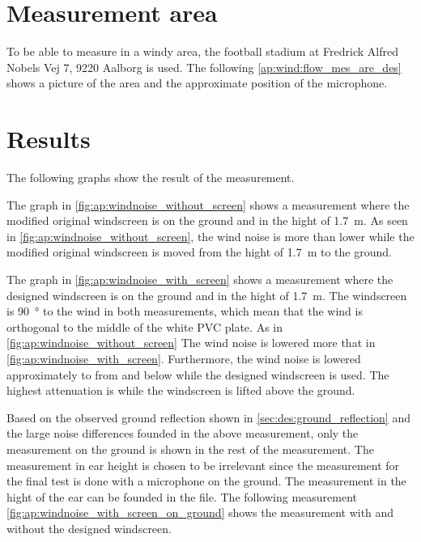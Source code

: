 \section*{Measurement area}
To be able to measure in a windy area, the football stadium at Fredrick Alfred Nobels Vej 7, 9220 Aalborg is used. The following \autoref{ap:wind:flow_mes_are_des} shows a picture of the area and the approximate position of the microphone.


\section*{Results}

The following graphs show the result of the measurement. 



The graph in \autoref{fig:ap:windnoise_without_screen} shows a measurement where the modified original windscreen is on the ground and in the hight of \SI{1.7}{\meter}. 
As seen in \autoref{fig:ap:windnoise_without_screen}, the wind noise is more than  lower while the modified original windscreen is moved from the hight of \SI{1.7}{\meter} to the ground. 



The graph in \autoref{fig:ap:windnoise_with_screen} shows a measurement where the designed windscreen is on the ground and in the hight of \SI{1.7}{\meter}. The windscreen is \SI{90}{\degree} to the wind in both measurements, which mean that the wind is orthogonal to the middle of the white PVC plate. 
As in \autoref{fig:ap:windnoise_without_screen} The wind noise is lowered more that   in \autoref{fig:ap:windnoise_with_screen}. Furthermore, the wind noise is lowered approximately  to  from  and below while the designed windscreen is used. The highest attenuation is while the windscreen is lifted above the ground.

Based on the observed ground reflection shown in \autoref{sec:des:ground_reflection} and the large noise differences founded in the above measurement, only the measurement on the ground is shown in the rest of the measurement. The measurement in ear height is chosen to be irrelevant since the measurement for the final test is done with a microphone on the ground. The measurement in the hight of the ear can be founded in the file. The following measurement \autoref{fig:ap:windnoise_with_screen_on_ground} shows the measurement with and without the designed windscreen. 


